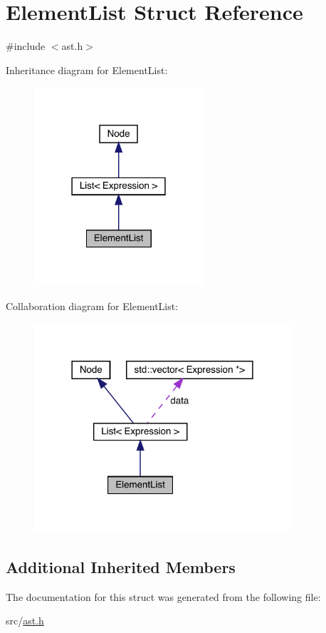 \hypertarget{struct_element_list}{}\section{Element\+List Struct Reference}
\label{struct_element_list}


{\ttfamily \#include $<$ast.\+h$>$}



Inheritance diagram for Element\+List\+:
\nopagebreak
\begin{figure}[H]
\begin{center}
\leavevmode
\includegraphics[width=178pt]{struct_element_list__inherit__graph}
\end{center}
\end{figure}


Collaboration diagram for Element\+List\+:
\nopagebreak
\begin{figure}[H]
\begin{center}
\leavevmode
\includegraphics[width=270pt]{struct_element_list__coll__graph}
\end{center}
\end{figure}
\subsection*{Additional Inherited Members}


The documentation for this struct was generated from the following file\+:\begin{DoxyCompactItemize}
\item 
src/\hyperlink{ast_8h}{ast.\+h}\end{DoxyCompactItemize}
